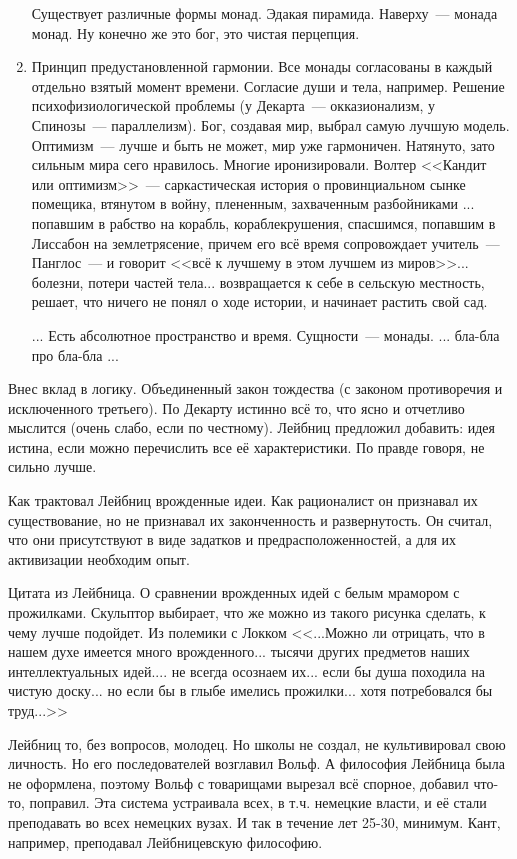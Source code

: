 \begin{enumerate}
	Существует различные формы монад. Эдакая пирамида. Наверху~--- монада монад. Ну конечно же это бог, это чистая перцепция.
	\item Принцип предустановленной гармонии. Все монады согласованы в каждый отдельно взятый момент времени. Согласие души и тела, например. Решение психофизиологической проблемы (у Декарта~--- окказионализм, у Спинозы~--- параллелизм). Бог, создавая мир, выбрал самую лучшую модель. Оптимизм~--- лучше и быть не может, мир уже гармоничен. Натянуто, зато сильным мира сего нравилось. Многие иронизировали. Волтер <<Кандит или оптимизм>>~--- саркастическая история о провинциальном сынке помещика, втянутом в войну, плененным, захваченным разбойниками ... попавшим в рабство на корабль, кораблекрушения, спасшимся, попавшим в Лиссабон на землетрясение, причем его всё время сопровождает учитель~--- Панглос~--- и говорит <<всё к лучшему в этом лучшем из миров>>... болезни, потери частей тела... возвращается к себе в сельскую местность, решает, что ничего не понял о ходе истории, и начинает растить свой сад. 
	\item[...] Есть абсолютное пространство и время. Сущности~--- монады. ... бла-бла про бла-бла ...
\end{enumerate}

Внес вклад в логику. Объединенный закон тождества (с законом противоречия и исключенного третьего). По Декарту истинно всё то, что ясно и отчетливо мыслится (очень слабо, если по честному). Лейбниц предложил добавить: идея истина, если можно перечислить все её характеристики. По правде говоря, не сильно лучше.

Как трактовал Лейбниц врожденные идеи. Как рационалист он признавал их существование, но не признавал их законченность и развернутость. Он считал, что они присутствуют в виде задатков и предрасположенностей, а для их активизации необходим опыт.

Цитата из Лейбница. О сравнении врожденных идей с белым мрамором с прожилками. Скульптор выбирает, что же можно из такого рисунка сделать, к чему лучше подойдет. Из полемики с Локком
<<...Можно ли отрицать, что в нашем духе имеется много врожденного... тысячи других предметов наших интеллектуальных идей.... не всегда осознаем их... если бы душа походила на чистую доску... но если бы в глыбе имелись прожилки... хотя потребовался бы труд...>>

Лейбниц то, без вопросов, молодец. Но школы не создал, не культивировал свою личность. Но его последователей возглавил Вольф. А философия Лейбница была не оформлена, поэтому Вольф с товарищами вырезал всё спорное, добавил что-то, поправил. Эта система устраивала всех, в т.ч. немецкие власти, и её стали преподавать во всех немецких вузах. И так в течение лет 25-30, минимум. Кант, например, преподавал Лейбницевскую философию.
 
